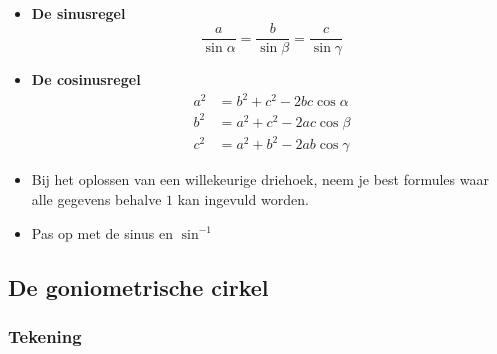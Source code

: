 \begin{onthoud}
	\ \\

\begin{itemize}
	\item \textbf{De sinusregel}
	\[\frac{a}{\sin \alpha}=\frac{b}{\sin \beta}=\frac{c}{\sin \gamma}\]
	\item \textbf{De cosinusregel}
	\begin{align*}
a^2&= b^2+c^2-2bc\cos \alpha\\
b^2&=a^2 + c^2 - 2ac\cos \beta\\
c^2&= a^2 + b^2 -2ab \cos \gamma
\end{align*}
\item Bij het oplossen van een willekeurige driehoek, neem je best formules waar alle gegevens behalve $1$ kan ingevuld worden.
\item Pas op met de sinus en $\sin^{-1}$
\end{itemize}


\end{onthoud}

\subsection{De goniometrische cirkel}


\subsubsection{Tekening}

